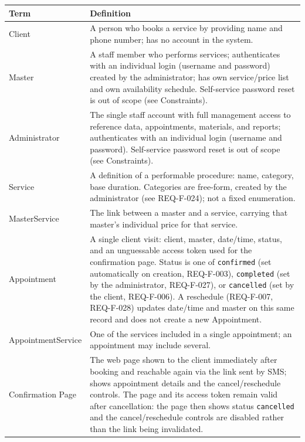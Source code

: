 \documentclass[11pt,a4paper]{article}
\begin{document}
\begin{longtable}{L{3.4cm}L{10.6cm}}
\toprule
Term & Definition \\
\midrule
\endhead

Client &
A person who books a service by providing name and phone number; has no
account in the system. \\

Master &
A staff member who performs services; authenticates with an individual
login (username and password) created by the administrator; has own
service/price list and own availability schedule. Self-service password
reset is out of scope (see Constraints). \\

Administrator &
The single staff account with full management access to reference data,
appointments, materials, and reports; authenticates with an individual
login (username and password). Self-service password reset is out of scope
(see Constraints). \\

Service &
A definition of a performable procedure: name, category, base duration.
Categories are free-form, created by the administrator
(see REQ-F-024); not a fixed enumeration. \\

MasterService &
The link between a master and a service, carrying that master's
individual price for that service. \\

Appointment &
A single client visit: client, master, date/time, status, and an
unguessable access token used for the confirmation page. Status is one of
\texttt{confirmed} (set automatically on creation, REQ-F-003),
\texttt{completed} (set by the administrator, REQ-F-027), or
\texttt{cancelled} (set by the client, REQ-F-006). A reschedule
(REQ-F-007, REQ-F-028) updates date/time and master on this same record
and does not create a new Appointment. \\

AppointmentService &
One of the services included in a single appointment; an appointment may
include several. \\

Confirmation Page &
The web page shown to the client immediately after booking and reachable
again via the link sent by SMS; shows appointment details and the
cancel/reschedule controls. The page and its access token remain valid
after cancellation: the page then shows status \texttt{cancelled} and
the cancel/reschedule controls are disabled rather than the link being
invalidated. \\


\end{longtable}
\end{document}
